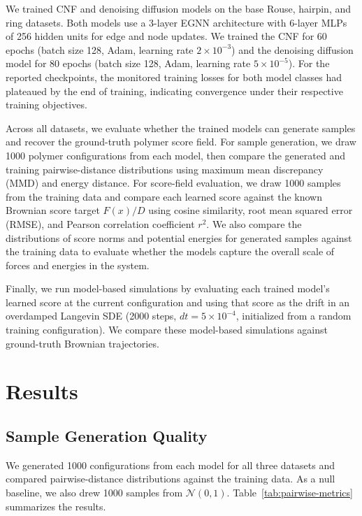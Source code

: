 \documentclass[reprint,amsmath,amssymb,aps,pra,10pt]{revtex4-2}
\begin{document}
We trained CNF and denoising diffusion models on the base Rouse, hairpin, and ring datasets.
Both models use a 3-layer EGNN architecture with 6-layer MLPs of 256 hidden units for edge and node updates.
We trained the CNF for 60 epochs (batch size 128, Adam, learning rate $2 \times 10^{-3}$) and the denoising diffusion model for 80 epochs (batch size 128, Adam, learning rate $5 \times 10^{-5}$).
For the reported checkpoints, the monitored training losses for both model classes had plateaued by the end of training, indicating convergence under their respective training objectives.

Across all datasets, we evaluate whether the trained models can generate samples and recover the ground-truth polymer score field.
For sample generation, we draw 1000 polymer configurations from each model, then compare the generated and training pairwise-distance distributions using maximum mean discrepancy (MMD) and energy distance.
For score-field evaluation, we draw 1000 samples from the training data and compare each learned score against the known Brownian score target $F(x)/D$ using cosine similarity, root mean squared error (RMSE), and Pearson correlation coefficient $r^2$.
We also compare the distributions of score norms and potential energies for generated samples against the training data to evaluate whether the models capture the overall scale of forces and energies in the system.

Finally, we run model-based simulations by evaluating each trained model's learned score at the current configuration and using that score as the drift in an overdamped Langevin SDE (2000 steps, $dt = 5 \times 10^{-4}$, initialized from a random training configuration).
We compare these model-based simulations against ground-truth Brownian trajectories.

\section{Results}

\subsection*{Sample Generation Quality}

We generated 1000 configurations from each model for all three datasets and compared pairwise-distance distributions against the training data.
As a null baseline, we also drew 1000 samples from $\mathcal{N}(0,1)$.
Table~\ref{tab:pairwise-metrics} summarizes the results.
\end{document}
